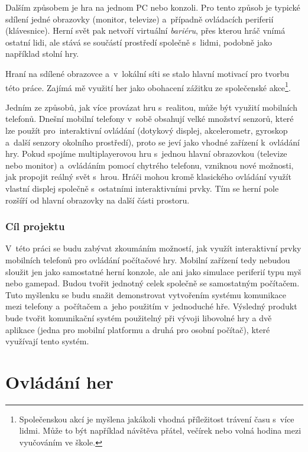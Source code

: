 \documentclass[thesis=B,czech,hidelinks]{FITthesis}[2012/06/26] %
\begin{document}
\begin{introduction}
Dalším způsobem je hra na jednom PC nebo konzoli. Pro tento způsob je typické sdílení jedné obrazovky (monitor, televize) a~případně ovládacích periferií (klávesnice). Herní svět pak netvoří virtuální \emph{bariéru}, přes kterou hráč vnímá ostatní lidi, ale stává se součástí prostředí společně s~lidmi, podobně jako například stolní hry.

Hraní na sdílené obrazovce a~v~lokální síti se stalo hlavní motivací pro tvorbu této práce. Zajímá mě využití her jako obohacení zážitku ze společenské akce\footnote{Společenskou akcí je myšlena jakákoli vhodná příležitost trávení času s~více lidmi. Může to být například návštěva přátel, večírek nebo volná hodina mezi vyučováním ve škole.}. 

Jedním ze způsobů, jak více provázat hru s~realitou, může být využití mobilních telefonů. Dnešní mobilní telefony v~sobě obsahují velké množství senzorů, které lze použít pro~interaktivní ovládání (dotykový displej, akcelerometr, gyroskop a~další senzory okolního prostředí), proto se jeví jako vhodné zařízení k~ovládání hry. Pokud spojíme multiplayerovou hru s~jednou hlavní obrazovkou (televize nebo monitor) a~ovládáním pomocí chytrého telefonu, vzniknou nové možnosti, jak propojit reálný svět s~hrou. Hráči mohou kromě klasického ovládání využít vlastní displej společně s~ostatními interaktivními prvky. Tím se herní pole rozšíří od hlavní obrazovky na další části prostoru.

\subsection{Cíl projektu}

V~této práci se budu zabývat zkoumáním možností, jak využít interaktivní prvky mobilních telefonů pro ovládání počítačové hry. Mobilní zařízení tedy nebudou sloužit jen jako samostatné herní konzole, ale ani jako simulace periferií typu myš nebo gamepad. Budou tvořit jednotný celek společně se samostatným počítačem. Tuto myšlenku se budu snažit demonstrovat vytvořením systému komunikace mezi telefony a~počítačem a~jeho použitím v~jednoduché hře. Výsledný produkt bude tvořit komunikační systém použitelný při vývoji libovolné hry a dvě aplikace (jedna pro mobilní platformu a druhá pro osobní počítač), které využívají tento systém.

\end{introduction}

\chapter{Ovládání her}
\end{document}
